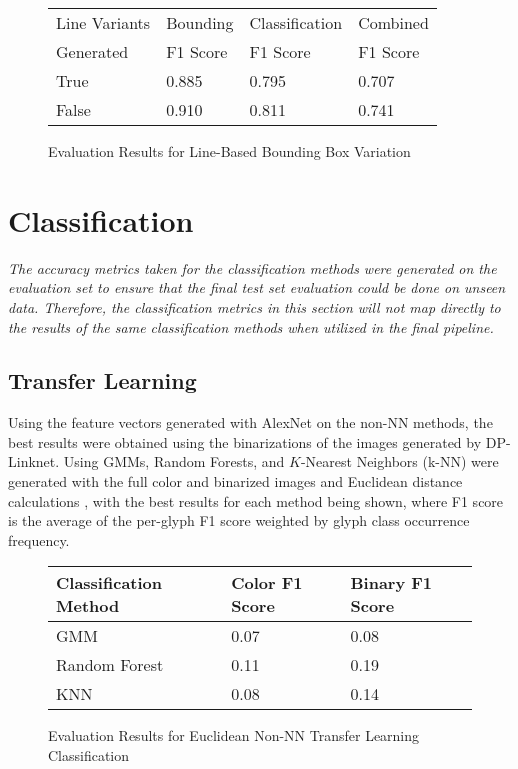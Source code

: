 \begin{figure}[H]
    \caption{Evaluation Results for Line-Based Bounding Box Variation}
    \label{fig:lineVariants}
    \begin{center}
      \begin{tabular}{ | l | l | l | l | }
          \hline
          Line Variants & Bounding & Classification & Combined \\
          Generated & F1 Score & F1 Score & F1 Score \\
          \hline
          True & 0.885 & 0.795 & 0.707 \\
          False & 0.910 &	0.811 &	0.741 \\
          \hline
      \end{tabular}
    \end{center}
\end{figure}

\section{Classification}

\textit{The accuracy metrics taken for the classification methods were generated on the evaluation set to ensure that the final test set evaluation could be done on unseen data. Therefore, the classification metrics in this section will not map directly to the results of the same classification methods when utilized in the final pipeline.}

\subsection{Transfer Learning}

Using the feature vectors generated with AlexNet on the non-NN methods, the best results were obtained using the binarizations of the images generated by DP-Linknet. Using GMMs, Random Forests, and $K$-Nearest Neighbors (k-NN)  were generated with the full color and binarized images and Euclidean distance calculations , with the best results for each method being shown, where F1 score is the average of the per-glyph F1 score weighted by glyph class occurrence frequency.

\begin{figure}[H]
    \caption{Evaluation Results for Euclidean Non-NN Transfer Learning Classification}
    \label{fig:classificationEuclideanNonNN}
    \centering
    \begin{tabular}{ | l | l | l | }
        \hline
        Classification Method & Color F1 Score & Binary F1 Score \\
        \hline
        GMM & 0.07 & 0.08 \\
        Random Forest & 0.11 & 0.19 \\
        KNN & 0.08 & 0.14 \\
        \hline
    \end{tabular}
\end{figure}


